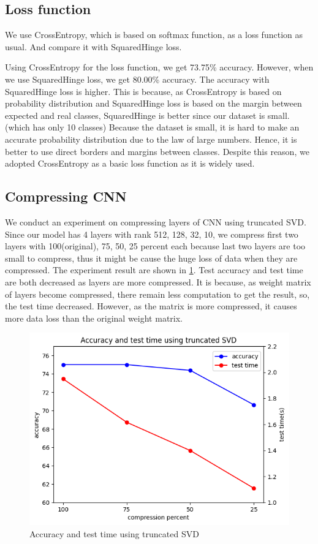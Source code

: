 \subsection{Loss function}
We use CrossEntropy, which is based on softmax function, as a loss function as usual. And compare it with SquaredHinge loss.

Using CrossEntropy for the loss function, we get 73.75\% accuracy. However, when we use SquaredHinge loss, we get 80.00\% accuracy. The accuracy with SquaredHinge loss is higher. This is because, as CrossEntropy is based on probability distribution and SquaredHinge loss is based on the margin between expected and real classes, SquaredHinge is better since our dataset is small. (which has only 10 classes) Because the dataset is small, it is hard to make an accurate probability distribution due to the law of large numbers. Hence, it is better to use direct borders and margins between classes.
Despite this reason, we adopted CrossEntropy as a basic loss function as it is widely used.

\subsection{Compressing CNN}
We conduct an experiment on compressing layers of CNN using truncated SVD. Since our model has 4 layers with rank 512, 128, 32, 10, we compress first two layers with 100(original), 75, 50, 25 percent each because last two layers are too small to compress, thus it might be cause the huge loss of data when they are compressed. The experiment result are shown in \cref{fig:cnn_svd}. Test accuracy and test time are both decreased as layers are more compressed. It is because, as weight matrix of layers become compressed, there remain less computation to get the result, so, the test time decreased. However, as the matrix is more compressed, it causes more data loss than the original weight matrix.

\begin{figure}[htbp]
	\centering
	\includegraphics[width=0.5\linewidth]{image/q4-6-svd.png}
	\caption{Accuracy and test time using truncated SVD}
	\label{fig:cnn_svd}
\end{figure}

